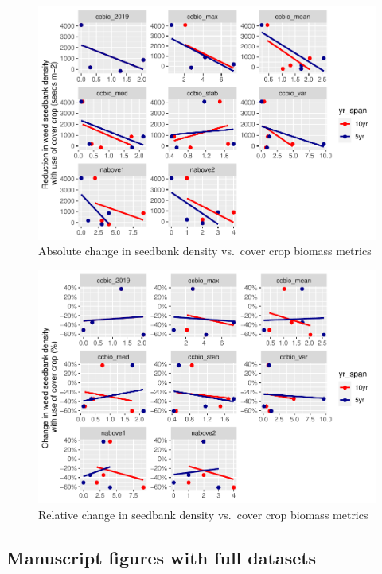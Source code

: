 \documentclass[]{article}
\begin{document}
\begin{figure}
\centering
\includegraphics{supp-mat_files/figure-latex/unnamed-chunk-2-1.pdf}
\caption{Absolute change in seedbank density vs.~cover crop biomass
metrics}
\end{figure}

\begin{figure}
\centering
\includegraphics{supp-mat_files/figure-latex/unnamed-chunk-3-1.pdf}
\caption{Relative change in seedbank density vs.~cover crop biomass
metrics}
\end{figure}

\newpage

\hypertarget{manuscript-figures-with-full-datasets}{%
\subsection{Manuscript figures with full
datasets}\label{manuscript-figures-with-full-datasets}}
\end{document}
